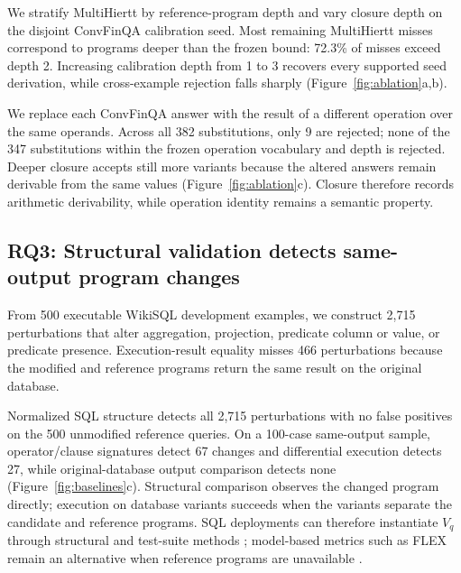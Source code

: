 We stratify MultiHiertt by reference-program depth and vary closure
depth on the disjoint ConvFinQA calibration seed. Most remaining
MultiHiertt misses correspond to programs deeper than the frozen
bound: 72.3\% of misses exceed depth 2. Increasing calibration
depth from 1 to 3 recovers every supported seed derivation, while
cross-example rejection falls sharply
(Figure~\ref{fig:ablation}a,b).

We replace each ConvFinQA answer with the result of a different
operation over the same operands. Across all 382 substitutions,
only 9 are rejected; none of the 347 substitutions within the
frozen operation vocabulary and depth is rejected. Deeper closure
accepts still more variants because the altered answers remain
derivable from the same values
(Figure~\ref{fig:ablation}c). Closure therefore records arithmetic
derivability, while operation identity remains a semantic property.

\subsection{RQ3: Structural validation detects same-output
program changes}
\label{sec:rq3}

From 500 executable WikiSQL development examples, we construct
2,715 perturbations that alter aggregation, projection, predicate
column or value, or predicate presence. Execution-result equality
misses 466 perturbations because the modified and reference
programs return the same result on the original database.

Normalized SQL structure detects all 2,715 perturbations with no
false positives on the 500 unmodified reference queries. On a
100-case same-output sample, operator/clause signatures detect
67 changes and differential execution detects 27, while
original-database output comparison detects none
(Figure~\ref{fig:baselines}c). Structural comparison observes the
changed program directly; execution on database variants succeeds
when the variants separate the candidate and reference programs.
SQL deployments can therefore instantiate $V_q$ through structural
and test-suite methods \citep{zhong2020testsuite}; model-based
metrics such as FLEX remain an alternative when reference programs
are unavailable \citep{kim2025flex}.

